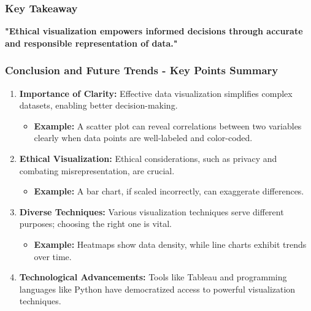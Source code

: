 \documentclass{beamer}
\begin{document}
\begin{frame}[fragile]
    \frametitle{Key Takeaway}
    \begin{block}{}
        \textbf{"Ethical visualization empowers informed decisions through accurate and responsible representation of data."}
    \end{block}
\end{frame}

\begin{frame}[fragile]
    \frametitle{Conclusion and Future Trends - Key Points Summary}
    \begin{enumerate}
        \item \textbf{Importance of Clarity:} 
        Effective data visualization simplifies complex datasets, enabling better decision-making.
        \begin{itemize}
            \item \textbf{Example:} A scatter plot can reveal correlations between two variables clearly when data points are well-labeled and color-coded.
        \end{itemize}
        
        \item \textbf{Ethical Visualization:} 
        Ethical considerations, such as privacy and combating misrepresentation, are crucial.
        \begin{itemize}
            \item \textbf{Example:} A bar chart, if scaled incorrectly, can exaggerate differences.
        \end{itemize}
        
        \item \textbf{Diverse Techniques:} 
        Various visualization techniques serve different purposes; choosing the right one is vital.
        \begin{itemize}
            \item \textbf{Example:} Heatmaps show data density, while line charts exhibit trends over time.
        \end{itemize}
        
        \item \textbf{Technological Advancements:} 
        Tools like Tableau and programming languages like Python have democratized access to powerful visualization techniques.
    \end{enumerate}
\end{frame}
\end{document}
